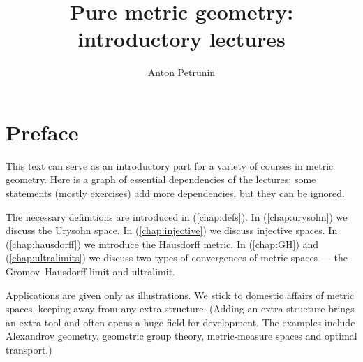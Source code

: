 \documentclass[twoside]{book}
\begin{document}

 
\title{Pure metric geometry:\\
introductory lectures}
\author{Anton Petrunin}
\date{}
\maketitle

\section*{Preface}

This text can serve as an introductory part for a variety of courses in metric geometry.
Here is a graph of essential dependencies of the lectures; some statements (mostly exercises) add more dependencies, but they can be ignored.
\begin{figure}[!ht]
\centering
{}
\end{figure}
The necessary definitions are introduced in (\ref{chap:defs}).
In (\ref{chap:urysohn}) we discuss the Urysohn space.
In (\ref{chap:injective}) we discuss injective spaces.
In (\ref{chap:hausdorff}) we introduce the Hausdorff metric.
In (\ref{chap:GH}) and (\ref{chap:ultralimits}) we discuss two types of convergences of metric spaces --- the Gromov--Hausdorff limit and ultralimit.

Applications are given only as illustrations.
We stick to domestic affairs of metric spaces, keeping away from any extra structure. 
(Adding an extra structure brings an extra tool and often opens a huge field for development.
The examples include Alexandrov geometry,
geometric group theory,
metric-measure spaces and optimal transport.)
\end{document}

